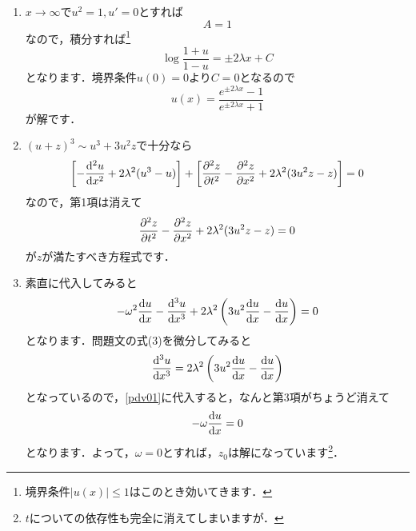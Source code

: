 \documentclass[a4paper,pdflatex,ja=standard]{bxjsarticle}
\begin{document}
\begin{enumerate}
\begin{enumerate}
    \item 
    $x\rightarrow\infty$で$u^2=1,u'=0$とすれば
    \begin{equation}
      A
      =
      1
    \end{equation}
    なので，積分すれば\footnote{
      境界条件$|u(x)|\leq 1$はこのとき効いてきます．
    }
    \begin{equation}
      \log
      \frac{1+u}{1-u}
      =
      \pm
      2\lambda x
      +
      C
    \end{equation}
    となります．境界条件$u(0)=0$より$C=0$となるので
    \begin{equation}
      u(x)
      =
      \dfrac{e^{\pm 2\lambda x}-1}{e^{\pm 2\lambda x}+1}
    \end{equation}
    が解です．

    \item 
    $(u+z)^3\sim u^3+3u^2z$で十分なら
    \begin{equation}
      \left[  
        -\dv[2]{u}{x}
        +
        2\lambda^2(u^3-u)
      \right]
      +
      \left[  
        \pdv[2]{z}{t}
        -
        \pdv[2]{z}{x}
        +
        2\lambda^2
        (
          3u^2z
          -
          z
        )
      \right]
      =
      0
    \end{equation}
    なので，第1項は消えて
    \begin{equation}
      \pdv[2]{z}{t}
        -
        \pdv[2]{z}{x}
        +
        2\lambda^2
        (
          3u^2z
          -
          z
        )
      =
      0
    \end{equation}
    が$z$が満たすべき方程式です．

    \item 
    素直に代入してみると
    \begin{equation}
      -
      \omega^2
      \dv{u}{x}
      -
      \dv[3]{u}{x}
      +
      2\lambda^2
      \left(  
        3u^2\dv{u}{x}
        -
        \dv{u}{x}
      \right)
      =
      0
      \label{pdv01}
    \end{equation}
    となります．問題文の式(3)を微分してみると
    \begin{equation}
      \dv[3]{u}{x}
      =
      2\lambda^2
      \left(  
        3u^2\dv{u}{x}
        -
        \dv{u}{x}
      \right)
    \end{equation}
    となっているので，\eqref{pdv01}に代入すると，なんと第3項がちょうど消えて
    \begin{equation}
      -\omega
      \dv{u}{x}
      =
      0
    \end{equation}
    となります．よって，$\omega=0$とすれば，$z_0$は解になっています\footnote{
      $t$についての依存性も完全に消えてしまいますが．
    }．

  \end{enumerate}

\end{enumerate}
\end{document}
